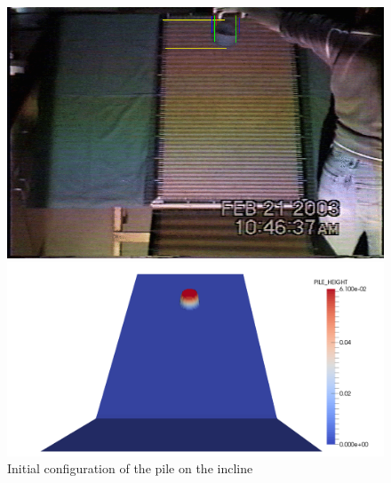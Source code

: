 \documentclass[letterpaper,10pt]{article}
\begin{document}
\begin{figure}[!ht]
        \begin{minipage}[b]{.5\linewidth}        
                \centering
                \includegraphics[width=1\textwidth]{IMAGES/expinitialconf.png}
        \end{minipage}
        \begin{minipage}[b]{.5\linewidth}
                \centering
                \includegraphics[width=1\textwidth]{IMAGES/initialconf.png}
        \end{minipage}
        \caption{Initial configuration of the pile on the incline}
        \label{initialconf}
\end{figure}
\end{document}
